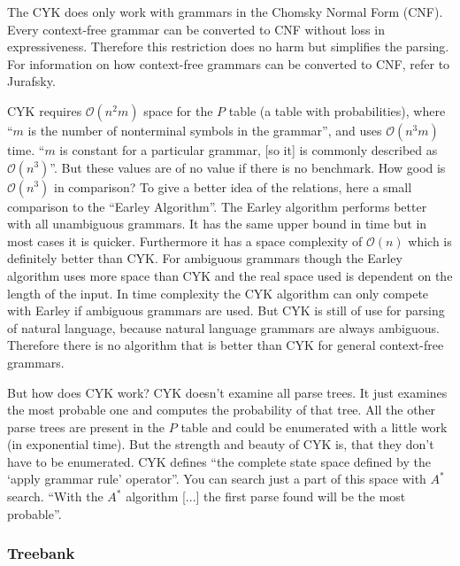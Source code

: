 \documentclass[12pt,twoside]{scrartcl}
\theoremstyle{plain}
\theoremstyle{definition}
\theoremstyle{remark}
\begin{document}
		The CYK does only work with grammars in the Chomsky Normal Form (CNF). Every context-free grammar can be converted to CNF without loss in expressiveness. Therefore this restriction does no harm but simplifies the parsing. For information on how context-free grammars can be converted to CNF, refer to Jurafsky\cite{Jurafsky2009b}.
		
		CYK requires $\mathcal{O}(n^{2}m)$ space for the $P$ table (a table with probabilities), where ``$m$ is the number of nonterminal symbols in the grammar''\cite[p.~893]{Russel2010}, and uses $\mathcal{O}(n^{3}m)$ time. ``$m$ is constant for a particular grammar, [so it] is commonly described as $\mathcal{O}(n^{3})$''\cite[p.~893]{Russel2010}. But these values are of no value if there is no benchmark. How good is $\mathcal{O}(n^{3})$ in comparison? To give a better idea of the relations, here a small comparison to the ``Earley Algorithm''\cite[p.~477]{Jurafsky2009b}. The Earley algorithm performs better with all unambiguous grammars.\cite{Li} It has the same upper bound in time but in most cases it is quicker. Furthermore it has a space complexity of $\mathcal{O}(n)$ which is definitely better than CYK.\cite{Li} For ambiguous grammars though the Earley algorithm uses more space than CYK and the real space used is dependent on the length of the input.\cite{Li} In time complexity the CYK algorithm can only compete with Earley if ambiguous grammars are used.\cite{Li} But CYK is still of use for parsing of natural language, because natural language grammars are always ambiguous. Therefore there is no algorithm that is better than CYK for general context-free grammars.\cite{Russel2010}
		
		But how does CYK work? CYK doesn't examine all parse trees. It just examines the most probable one and computes the probability of that tree. All the other parse trees are present in the $P$ table and could be enumerated with a little work (in exponential time). But the strength and beauty of CYK is, that they don't have to be enumerated. CYK defines ``the complete state space defined by the `apply grammar rule' operator''\cite[p.~894]{Russel2010}. You can search just a part of this space with $A^{*}$ search.\cite{Russel2010} ``With the $A^{*}$ algorithm [...] the first parse found will be the most probable''\cite[p.~895]{Russel2010}.
		
		\subsubsection*{Treebank}
		\label{subSubSec:treebank}
		
\end{document}
